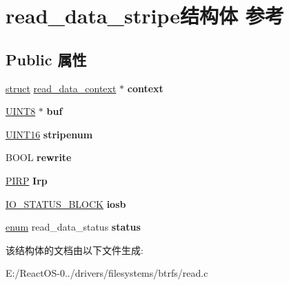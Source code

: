 \hypertarget{structread__data__stripe}{}\section{read\+\_\+data\+\_\+stripe结构体 参考}
\label{structread__data__stripe}
\subsection*{Public 属性}
\begin{DoxyCompactItemize}
\item 
\mbox{\label{structread__data__stripe_ad59b9754e54796fb025778928ee0215d}} 
\hyperlink{interfacestruct}{struct} \hyperlink{structread__data__context}{read\+\_\+data\+\_\+context} $\ast$ {\bfseries context}
\item 
\mbox{\label{structread__data__stripe_acf57346fa2bccbd29664a96f1a82b146}} 
\hyperlink{_processor_bind_8h_ab27e9918b538ce9d8ca692479b375b6a}{U\+I\+N\+T8} $\ast$ {\bfseries buf}
\item 
\mbox{\label{structread__data__stripe_a64521d49fde0776f872780c6bbe2a084}} 
\hyperlink{_processor_bind_8h_a09f1a1fb2293e33483cc8d44aefb1eb1}{U\+I\+N\+T16} {\bfseries stripenum}
\item 
\mbox{\label{structread__data__stripe_a533411713c405c240feae9b2d99e59a9}} 
B\+O\+OL {\bfseries rewrite}
\item 
\mbox{\label{structread__data__stripe_af97b9522ecc0275627058c516de0ab26}} 
\hyperlink{interfacevoid}{P\+I\+RP} {\bfseries Irp}
\item 
\mbox{\label{structread__data__stripe_a1cd922b3902a2cc4fab1af45cc35e246}} 
\hyperlink{struct___i_o___s_t_a_t_u_s___b_l_o_c_k}{I\+O\+\_\+\+S\+T\+A\+T\+U\+S\+\_\+\+B\+L\+O\+CK} {\bfseries iosb}
\item 
\mbox{\label{structread__data__stripe_ab6856c1179806d0e126dc967876985b1}} 
\hyperlink{interfaceenum}{enum} read\+\_\+data\+\_\+status {\bfseries status}
\end{DoxyCompactItemize}


该结构体的文档由以下文件生成\+:\begin{DoxyCompactItemize}
\item 
E\+:/\+React\+O\+S-\/0../drivers/filesystems/btrfs/read.\+c\end{DoxyCompactItemize}

